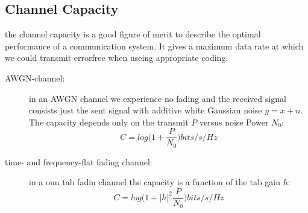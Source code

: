 \subsection{Channel Capacity}
the channel capacity is a good figure of merit to describe the optimal performance of a communication system. It gives a maximum data rate at which we could transmit errorfree when useing appropriate coding.
\begin{description}
	\item[AWGN-channel:] in an AWGN channel we experience no fading and the received signal consists just the sent signal with additive white Gaussian noise $y=x+n$. The capacity depends only on the transmit $P$ versus noise Power $N_0$: $$C=log\Biggr(1+\frac{P}{N_0}\Biggl) bits/s/Hz$$
	\item[time- and frequency-flat fading channel:] in a oun tab fadin channel the capacity is a function of the tab gain $h$: $$C=log\Biggr(1+|h|^2\frac{P}{N_0}\Biggl) bits/s/Hz$$
\end{description}
